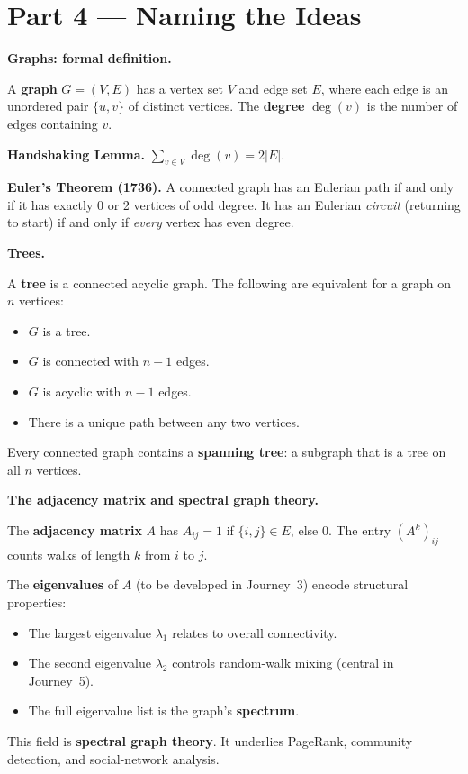 \documentclass[12pt, a4paper]{article}
\begin{document}
\section{Part 4 --- Naming the Ideas}

\begin{namebox}
\textbf{Graphs: formal definition.}

A \textbf{graph} $G = (V, E)$ has a vertex set $V$ and edge set $E$, where each edge is an unordered pair $\{u,v\}$ of distinct vertices. The \textbf{degree} $\deg(v)$ is the number of edges containing $v$.

\medskip
\textbf{Handshaking Lemma.} $\displaystyle\sum_{v \in V} \deg(v) = 2|E|$.

\medskip
\textbf{Euler's Theorem (1736).} A connected graph has an Eulerian path if and only if it has exactly 0 or 2 vertices of odd degree. It has an Eulerian \emph{circuit} (returning to start) if and only if \emph{every} vertex has even degree.
\end{namebox}

\begin{namebox}
\textbf{Trees.}

A \textbf{tree} is a connected acyclic graph. The following are equivalent for a graph on $n$ vertices:
\begin{itemize}[topsep=3pt]
  \item $G$ is a tree.
  \item $G$ is connected with $n-1$ edges.
  \item $G$ is acyclic with $n-1$ edges.
  \item There is a unique path between any two vertices.
\end{itemize}
Every connected graph contains a \textbf{spanning tree}: a subgraph that is a tree on all $n$ vertices.
\end{namebox}

\begin{namebox}
\textbf{The adjacency matrix and spectral graph theory.}

The \textbf{adjacency matrix} $A$ has $A_{ij} = 1$ if $\{i,j\} \in E$, else $0$. The entry $(A^k)_{ij}$ counts walks of length $k$ from $i$ to $j$.

The \textbf{eigenvalues} of $A$ (to be developed in Journey~3) encode structural properties:
\begin{itemize}[topsep=3pt]
  \item The largest eigenvalue $\lambda_1$ relates to overall connectivity.
  \item The second eigenvalue $\lambda_2$ controls random-walk mixing (central in Journey~5).
  \item The full eigenvalue list is the graph's \textbf{spectrum}.
\end{itemize}
This field is \textbf{spectral graph theory}. It underlies PageRank, community detection, and social-network analysis.
\end{namebox}
\end{document}
